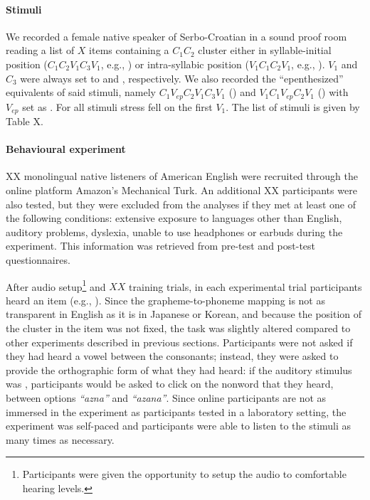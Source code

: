 {\paragraph{Stimuli}
We recorded a female native speaker of Serbo-Croatian in a sound proof room reading a list of {\color{red}$X$} items containing a $C_{1}C_{2}$ cluster either in syllable-initial position ($C_{1}C_{2}V_{1}C_{3}V_{1}$, e.g., ) or intra-syllabic position ($V_{1}C_{1}C_{2}V_{1}$, e.g., ). $V_{1}$ and $C_{3}$ were always set to  and , respectively. 
We also recorded the ``epenthesized'' equivalents of said stimuli, namely $C_{1}V_{ep}C_{2}V_{1}C_{3}V_{1}$ () and $V_{1}C_{1}V_{ep}C_{2}V_{1}$ () with $V_{ep}$ set as {\color{red}\textipa{[@]}}.
For all stimuli stress fell on the first $V_{1}$.
{\color{red}The list of stimuli is given by Table X.}

\paragraph{Behavioural experiment}
{\color{red}XX} monolingual native listeners of American English were recruited through the online platform Amazon's Mechanical Turk. An additional {\color{red}XX participants were also tested, but they were excluded from the analyses if they met at least one of the following conditions: extensive exposure to languages other than English, auditory problems, dyslexia, unable to use headphones or earbuds during the experiment}. This information was retrieved from pre-test and post-test questionnaires.

After audio setup\footnote{Participants were given the opportunity to setup the audio to comfortable hearing levels.} and {\color{red}$XX$} training trials, in each experimental trial participants heard an item (e.g., ). Since the grapheme-to-phoneme mapping is not as transparent in English as it is in Japanese or Korean, and because the position of the cluster in the item was not fixed, the task was slightly altered compared to other experiments described in previous sections. Participants were not asked if they had heard a vowel between the consonants; instead, they were asked to provide the orthographic form of what they had heard: if the auditory stimulus was , participants would be asked to click on the nonword that they heard, between options \textit{``azna''} and  \textit{``azana''}. Since online participants are not as immersed in the experiment as participants tested in a laboratory setting, the experiment was self-paced and participants were able to listen to the stimuli as many times as necessary.

}
